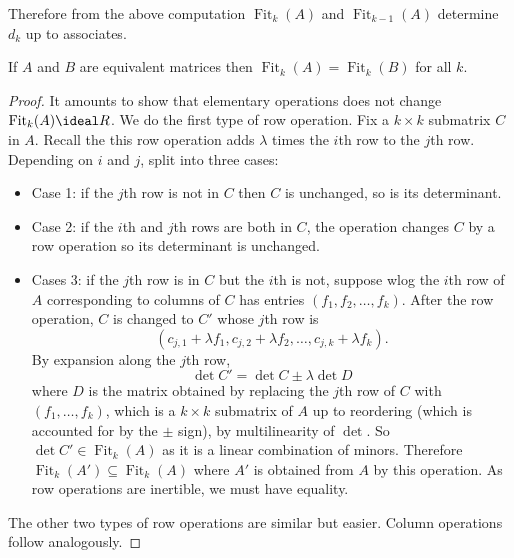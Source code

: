 \documentclass[a4paper]{article}
\DeclareMathOperator{\fit}{Fit}
\begin{document}
Therefore from the above computation \(\fit_k(A)\) and \(\fit_{k - 1}(A)\) determine \(d_k\) up to associates.

\begin{lemma}
  If \(A\) and \(B\) are equivalent matrices then \(\fit_k(A) = \fit_k(B)\) for all \(k\).
\end{lemma}

\begin{proof}
  It amounts to show that elementary operations does not change \(\fit_k(A) \ideal R\). We do the first type of row operation. Fix a \(k \times k\) submatrix \(C\) in \(A\). Recall the this row operation adds \(\lambda\) times the \(i\)th row to the \(j\)th row. Depending on \(i\) and \(j\), split into three cases:
  \begin{itemize}
  \item Case 1: if the \(j\)th row is not in \(C\) then \(C\) is unchanged, so is its determinant.
  \item Case 2: if the \(i\)th and \(j\)th rows are both in \(C\), the operation changes \(C\) by a row operation so its determinant is unchanged.
  \item Cases 3: if the \(j\)th row is in \(C\) but the \(i\)th is not, suppose wlog the \(i\)th row of \(A\) corresponding to columns of \(C\) has entries \((f_1, f_2, \dots, f_k)\). After the row operation, \(C\) is changed to \(C'\) whose \(j\)th row is
    \[
      (c_{j, 1} + \lambda f_1, c_{j, 2} + \lambda f_2, \dots, c_{j, k} + \lambda f_k).
    \]
    By expansion along the \(j\)th row,
    \[
      \det C' = \det C \pm \lambda \det D
    \]
    where \(D\) is the matrix obtained by replacing the \(j\)th row of \(C\) with \((f_1, \dots, f_k)\), which is a \(k \times k\) submatrix of \(A\) up to reordering (which is accounted for by the \(\pm\) sign), by multilinearity of \(\det\). So \(\det C' \in \fit_k(A)\) as it is a linear combination of minors. Therefore \(\fit_k(A') \subseteq \fit_k(A)\) where \(A'\) is obtained from \(A\) by this operation. As row operations are inertible, we must have equality.
  \end{itemize}

  The other two types of row operations are similar but easier. Column operations follow analogously.
\end{proof}
\end{document}
